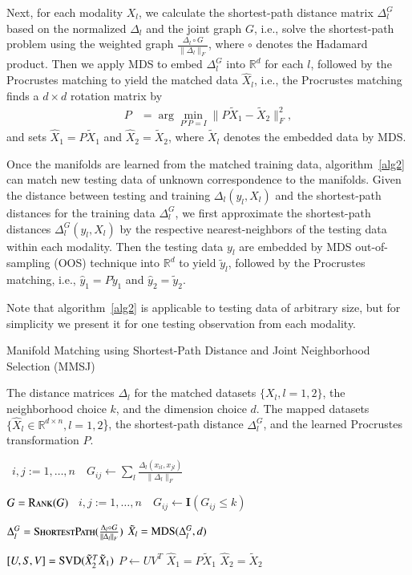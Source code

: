 \documentclass[times,twocolumn,final]{elsarticle}
\newcommand{\Linefor}[2]{%
    \State \algorithmicfor\ {#1}\ \algorithmicdo\ {#2} \algorithmicend\ \algorithmicfor%
}
\newcommand{\rto}{\leftarrow}
\providecommand{\mb}[1]{\boldsymbol{#1}}
\begin{document}
Next, for each modality $X_{l}$, we calculate the shortest-path distance matrix $\Delta_{l}^{G}$ based on the normalized $\Delta_{l}$ and the joint graph $G$, i.e., solve the shortest-path problem using the weighted graph $\frac{\Delta_{l} \circ G }{\|\Delta_{l}\|_{F}}$, where $\circ$ denotes the Hadamard product. Then we apply MDS to embed $\Delta_{l}^{G}$ into $\mathbb{R}^{d}$ for each $l$, followed by the Procrustes matching to yield the matched data $\hat{X}_{l}$, i.e., the Procrustes matching finds a $d \times d$ rotation matrix by
\begin{align*}
P&=\arg\min_{P'P=I} \|P \tilde{X}_{1}-\tilde{X}_{2}\|_{F}^{2},
\end{align*}
and sets $\hat{X}_{1}=P \tilde{X}_{1}$ and $\hat{X}_{2}=\tilde{X}_{2}$, where $\tilde{X}_{l}$ denotes the embedded data by MDS.

Once the manifolds are learned from the matched training data, algorithm~\ref{alg2} can match new testing data of unknown correspondence to the manifolds. Given the distance between testing and training $\Delta_{l}(y_{l},X_{l})$ and the shortest-path distances for the training data $\Delta_{l}^{G}$, we first approximate the shortest-path distances $\Delta_{l}^{G}(y_{l},X_{l})$ by the respective nearest-neighbors of the testing data within each modality. Then the testing data $y_{l}$ are embedded by MDS out-of-sampling (OOS) technique into $\mathbb{R}^{d}$ to yield $\tilde{y}_{l}$, followed by the Procrustes matching, i.e., $\hat{y}_{1}=P \tilde{y}_{1}$ and $\hat{y}_{2}=\tilde{y}_{2}$.

Note that algorithm~\ref{alg2} is applicable to testing data of arbitrary size, but for simplicity we present it for one testing observation from each modality. 

\begin{algorithm}
\caption{Manifold Matching using Shortest-Path Distance and Joint Neighborhood Selection (MMSJ)}
\label{alg1}
\begin{algorithmic}[1]
\Require The distance matrices $\Delta_{l}$ for the matched datasets $\{X_{l}, l=1,2\}$, the neighborhood choice $k$, and the dimension choice $d$.
\Ensure The mapped datasets $\{\hat{X}_{l} \in \mathbb{R}^{d \times n}, l=1,2$\}, the shortest-path distance $\Delta_{l}^{G}$, and the learned Procrustes transformation $P$.

\Linefor{$i,j:=1,\ldots,n$}{$G_{ij} \rto \sum_{l} \frac{\Delta_{l}(x_{il},x_{jl})}{\|\Delta_{l}\|_{F}}$} 
\State $G = \textsc{Rank}(G)$ 
\Linefor{$i,j:=1,\ldots,n$}{$G_{ij} \rto \mb{I}(G_{ij} \leq k)$} 
\State $\Delta_{l}^{G} = \textsc{ShortestPath}(\frac{\Delta_{l} \circ G }{\|\Delta_{l}\|_{F}})$ 
\State $\tilde{X}_{l}=\textsc{MDS}(\Delta_{l}^{G},d)$ 
\EndFor

\State $[U,S,V]=\textsc{SVD}(\tilde{X}_{2}^{T}\tilde{X}_{1})$
\State $P \rto UV^{T}$ 
\State $\hat{X}_{1}=P \tilde{X}_{1}$
\State $\hat{X}_{2}=\tilde{X}_{2}$
\EndFunction
\end{algorithmic}
\end{algorithm}
\end{document}
